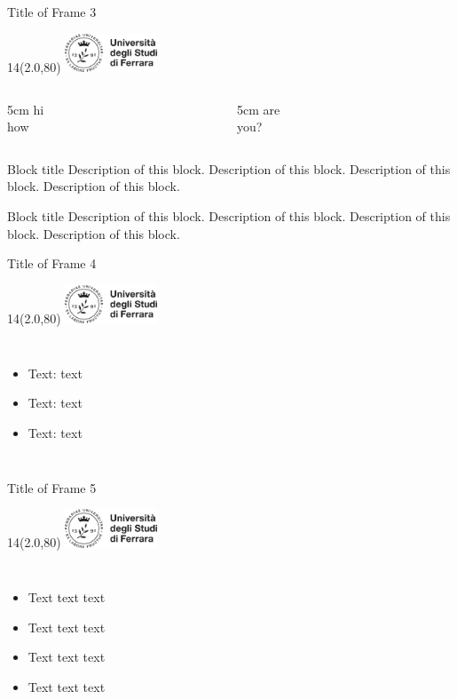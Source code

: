 \documentclass[11pt,xcolor={dvipsnames},default]{beamer} %
\newcommand{\MyLogo}{%
\begin{textblock}{14}(2.0,80)
 \includegraphics[height=1.15cm, angle=0]{logo}
\end{textblock}
}
\begin{document}
\begin{frame}{Title of Frame 3}
\MyLogo
\begin{columns}
\begin{column}[T]{5cm}
hi \\ how
\end{column}
\begin{column}[T]{5cm}
are \\ you?
\end{column}
\end{columns}
\begin{block}{Block title}
Description of this block. Description of this block. Description of this block. Description of this block.
\end{block}
\bigskip \bigskip
\begin{block}{Block title}
Description of this block. Description of this block. Description of this block. Description of this block.
\end{block}
\end{frame}

\begin{frame}{Title of Frame 4}
\MyLogo
\begin{columns}
	\begin{itemize}
  		\item<1-> Text: \alert{text}
  		\item<2-> Text: \alert{text}
		\item<3-> Text: \alert{text}
  	\end{itemize}
\end{columns}
\end{frame}

\begin{frame}{Title of Frame 5}
\MyLogo
\begin{columns}
	\begin{itemize}
  		\item Text text text
  		\item Text text text
		\item Text text text
		\item Text text text
  	\end{itemize}
\end{columns}
\end{frame}
\end{document}
